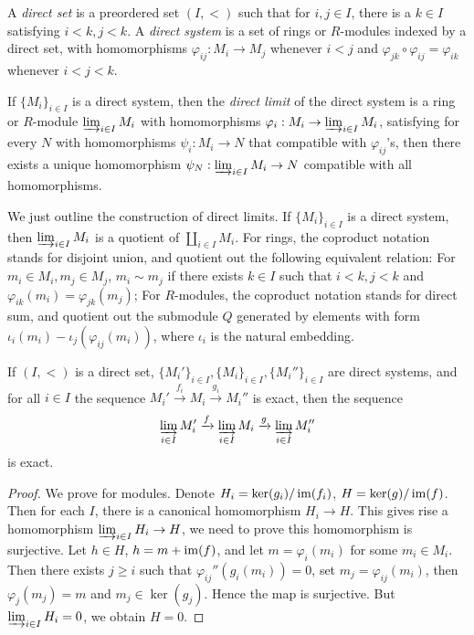 \begin{defn}
    A \emph{direct set} is a preordered set $(I,<)$ such that for $i,j\in I$, there is a $k\in I$ satisfying $i<k,j<k$.
    A \emph{direct system} is a set of rings or $R$-modules indexed by a direct set, with homomorphisms $\varphi_{ij}:M_i\to M_j$ whenever $i<j$ and $\varphi_{jk}\circ\varphi_{ij}=\varphi_{ik}$ whenever $i<j<k$.

    If $\{M_i\}_{i\in I}$ is a direct system, then the \emph{direct limit} of the direct system is a ring or $R$-module $\varinjlim_{i\in I}M_i$ with homomorphisms $\varphi_i:M_i\to\varinjlim_{i\in I}M_i$, satisfying for every $N$ with homomorphisms $\psi_i:M_i\to N$ that compatible with $\varphi_{ij}$'s, then there exists a unique homomorphism $\psi_N:\varinjlim_{i\in I}M_i\to N$ compatible with all homomorphisms.
\end{defn}

We just outline the construction of direct limits.
If $\{M_i\}_{i\in I}$ is a direct system, then $\varinjlim_{i\in I}M_i$ is a quotient of $\coprod_{i\in I}M_i$.
For rings, the coproduct notation stands for disjoint union, and quotient out the following equivalent relation: For $m_i\in M_i,m_j\in M_j$, $m_i\sim m_j$ if there exists $k\in I$ such that $i<k,j<k$ and $\varphi_{ik}(m_i)=\varphi_{jk}(m_j)$;
For $R$-modules, the coproduct notation stands for direct sum, and quotient out the submodule $Q$ generated by elements with form $\iota_i(m_i)-\iota_j(\varphi_{ij}(m_i))$, where $\iota_i$ is the natural embedding. 

\begin{prop}\label{colim exact}
    If $(I,<)$ is a direct set, $\{M_i'\}_{i\in I},\{M_i\}_{i\in I},\{M_i''\}_{i\in I}$ are direct systems, and for all $i\in I$ the sequence $M_i'\xrightarrow{f_i}M_i\xrightarrow{g_i}M_i''$ is exact, then the sequence
    \[\varinjlim_{i\in I}M_i'\xrightarrow{f}\varinjlim_{i\in I}M_i\xrightarrow{g}\varinjlim_{i\in I}M_i''\]
    is exact.
\end{prop}
\begin{proof}
    We prove for modules.
    Denote $H_i=\ker(g_i)/\operatorname{im}(f_i)$, $H=\ker(g)/\operatorname{im}(f)$.
    Then for each $I$, there is a canonical homomorphism $H_i\to H$.
    This gives rise a homomorphism $\varinjlim_{i\in I}H_i\to H$, we need to prove this homomorphism is surjective.
    Let $h\in H$, $h=m+\operatorname{im}(f)$, and let $m=\varphi_i(m_i)$ for some $m_i\in M_i$.
    Then there exists $j\geq i$ such that $\varphi_{ij}''(g_i(m_i))=0$, set $m_j=\varphi_{ij}(m_i)$, then $\varphi_j(m_j)=m$ and $m_j\in\ker(g_j)$.
    Hence the map is surjective.
    But $\varinjlim_{i\in I}H_i=0$, we obtain $H=0$.
\end{proof}

